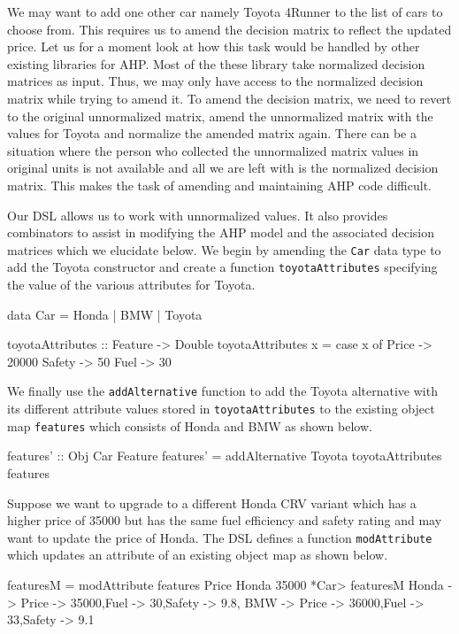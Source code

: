 \documentclass{jfp}
\newcommand{\prog}[1]{\texttt{#1}}
\begin{document}
We may want to add one other car namely Toyota 4Runner to the list of cars to choose from. This requires us to amend the decision matrix to reflect the updated price. Let us for a moment look at how this task would be handled by other existing libraries for AHP. Most of the these library take normalized decision matrices as input. Thus, we may only have access to the normalized decision matrix while trying to amend it. To amend the decision matrix, we need to revert to the original unnormalized matrix, amend the unnormalized matrix with the values for Toyota and normalize the amended matrix again. There can be a situation where the person who collected the unnormalized matrix values in original units is not available and all we are left with is the normalized decision matrix. This makes the task of amending and maintaining AHP code difficult. 

Our DSL allows us to work with unnormalized values. It also provides combinators to assist in modifying the AHP model and the associated decision matrices which we elucidate below. We begin by amending the \prog{Car} data type to add the Toyota constructor and create a function \prog{toyotaAttributes} specifying the value of the various attributes for Toyota. 
\begin{haskellcode}
data Car = Honda | BMW | Toyota 

toyotaAttributes :: Feature -> Double
toyotaAttributes x = case x of
        Price  -> 20000
        Safety -> 50
        Fuel   -> 30
\end{haskellcode}
We finally use the \prog{addAlternative} function to add the Toyota alternative with its different attribute values stored in \prog{toyotaAttributes} to the existing object map \prog{features} which consists of Honda and BMW as shown below. 
\begin{haskellcode}
features' :: Obj Car Feature
features' = addAlternative Toyota toyotaAttributes features
 \end{haskellcode}

Suppose we want to upgrade to a different Honda CRV variant which has a higher price of 35000 but has the same fuel efficiency and safety rating and may want to update the price of Honda. The DSL defines a function \prog{modAttribute} which updates an attribute of an existing object map as shown below. 
\begin{haskellcode}
featuresM = modAttribute features Price Honda 35000
*Car> featuresM
{Honda  -> {Price -> 35000,Fuel -> 30,Safety -> 9.8},
 BMW    -> {Price -> 36000,Fuel -> 33,Safety -> 9.1}}
\end{haskellcode}
\end{document}
